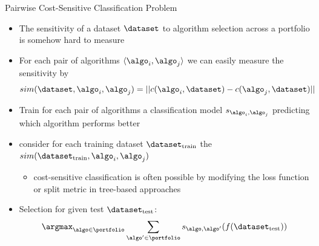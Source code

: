 \begin{frame}[c]{Pairwise Cost-Sensitive Classification Problem }

\begin{itemize}
	\item The sensitivity of a dataset $\dataset$ to algorithm selection across a portfolio is somehow hard to measure
	\pause
	\item For each pair of algorithms $\langle \algo_i, \algo_j \rangle$ we can easily measure the sensitivity by
	$$sim(\dataset, \algo_i, \algo_j) = || c(\algo_i, \dataset) - c(\algo_j, \dataset) ||$$
	\pause
	\item Train for each pair of algorithms a classification model $s_{ \algo_i, \algo_j}$ predicting which algorithm performs better
	\item consider for each training dataset $\dataset_{\text{train}}$ the $sim(\dataset_{\text{train}}, \algo_i, \algo_j)$
	\begin{itemize}
		\item cost-sensitive classification is often possible by modifying the loss function or split metric in tree-based approaches
	\end{itemize}
	\item Selection for given test $\dataset_{\text{test}}$:
	$$\argmax_{\algo \in \portfolio} \sum_{\algo' \in \portfolio} s_{\algo, \algo'}(f(\dataset_{\text{test}})) $$
	
\end{itemize}

\end{frame}
